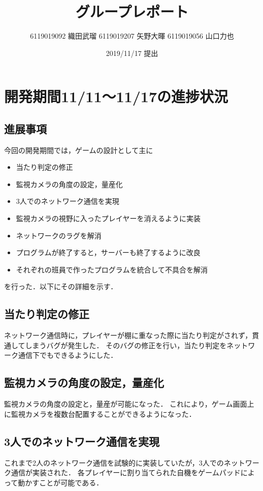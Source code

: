 \documentclass{jarticle}
\title{グループレポート}
\author{6119019092 織田武瑠 6119019207 矢野大暉 6119019056 山口力也}
\date{2019/11/17 提出}
\begin{document}
\maketitle

\section{開発期間11/11～11/17の進捗状況} 
\subsection{進展事項}
今回の開発期間では，ゲームの設計として主に
\begin{itemize}
\item 当たり判定の修正
\item 監視カメラの角度の設定，量産化
\item 3人でのネットワーク通信を実現
\item 監視カメラの視野に入ったプレイヤーを消えるように実装
\item ネットワークのラグを解消
\item プログラムが終了すると，サーバーも終了するように改良
\item それぞれの班員で作ったプログラムを統合して不具合を解消
\end{itemize}
を行った．以下にその詳細を示す．

\subsection{当たり判定の修正}
ネットワーク通信時に，プレイヤーが棚に重なった際に当たり判定がされず，貫通してしまうバグが発生した．
そのバグの修正を行い，当たり判定をネットワーク通信下でもできるようにした．

\subsection{監視カメラの角度の設定，量産化}
監視カメラの角度の設定と，量産が可能になった．
これにより，ゲーム画面上に監視カメラを複数台配置することができるようになった．

\subsection{3人でのネットワーク通信を実現}
これまで2人のネットワーク通信を試験的に実装していたが，3人でのネットワーク通信が実装された．
各プレイヤーに割り当てられた自機をゲームパッドによって動かすことが可能である．
\end{document}

